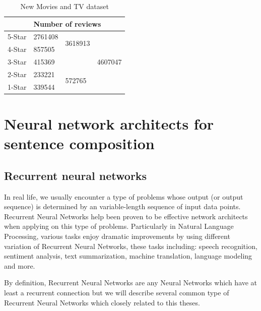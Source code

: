 \begin{table}[H]
	\centering
	\caption{New Movies and TV dataset}
	\label{table:moviereview}
	\begin{tabular}{@{}lllc@{}}
		\toprule
		& \multicolumn{3}{l}{Number of reviews}                         \\ \midrule
		5-Star & 2761408 & \multirow{2}{*}{3618913} & \multirow{5}{*}{4607047} \\ \cmidrule(r){1-2}
		4-Star & 857505  &                          &                          \\ \cmidrule(r){1-3}
		3-Star & \multicolumn{2}{l}{415369}         &                          \\ \cmidrule(r){1-3}
		2-Star & 233221  & \multirow{2}{*}{572765}  &                          \\ \cmidrule(r){1-2}
		1-Star & 339544  &                          &                          \\ \bottomrule
	\end{tabular}
\end{table}


\section{Neural network architects for sentence composition}\label{sec:composer}
\subsection{Recurrent neural networks}\label{sec:RNN}
In real life, we usually encounter a type of problems whose output (or output sequence) is determined by an variable-length sequence of input data points. 
Recurrent Neural Networks help been proven to be effective network architects when applying on this type of problems.  
Particularly in Natural Language Processing, various tasks enjoy dramatic improvements by using different variation of Recurrent Neural Networks, these tasks including:  speech recognition\cite{speech-lstm}\cite{MiaoGM15}, sentiment analysis\cite{treeLSTM}\cite{cnn-rnn}\cite{attention-gru}, text summarization\cite{RushCW15}\cite{NallapatiXZ16}, machine translation\cite{FiratCB16}\cite{SutskeverVL14}\cite{BritzGLL17}, language modeling\cite{mikolov-nlm}\cite{JozefowiczVSSW16} and more\cite{deep-nlp}\cite{Schmidhuber14}\cite{deeplearning-book}.

By definition, Recurrent Neural Networks are any Neural Networks which have at least a recurrent connection\cite{rnn-def} but we will describe several common type of Recurrent Neural Networks which closely related to this theses.

